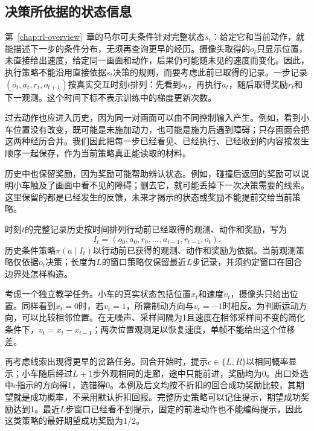 \subsection{决策所依据的状态信息}
\label{sec:rl-information-state-information}

第~\ref{chap:rl-overview}~章的马尔可夫条件针对完整状态$s_t$：给定它和当前动作，就能描述下一步的条件分布，无须再查询更早的经历。摄像头取得的$o_t$只显示位置，未直接给出速度，给定同一画面和动作，后果仍可能随未见的速度而变化。因此，执行策略不能沿用直接依据$s_t$决策的规则，而要考虑此前已取得的记录。一步记录$(o_t,a_t,r_t,o_{t+1})$按真实交互时刻$t$排列：先看到$o_t$，再执行$a_t$，随后取得奖励$r_t$和下一观测。这个时间下标不表示训练中的梯度更新次数。

过去动作也应进入历史，因为同一对画面可以由不同控制输入产生。例如，看到小车位置没有改变，既可能是未施加动力，也可能是施力后遇到障碍；只存画面会把这两种经历合并。我们因此把每一步已经看见、已经执行、已经收到的内容按发生顺序一起保存，作为当前策略真正能读取的材料。

历史中也保留奖励，因为奖励可能帮助辨认状态。例如，碰撞后返回的奖励可以说明小车触及了画面中看不见的障碍；删去它，就可能丢掉下一次决策需要的线索。这里保留的都是已经发生的反馈，未来才揭示的状态或奖励不能提前交给当前策略。

\begin{definition}[决策历史]
  \label{def:rl-information-history}
  时刻$t$的完整记录历史按时间排列行动前已经取得的观测、动作和奖励，写为
  \[
    I_t=(o_0,a_0,r_0,\ldots,a_{t-1},r_{t-1},o_t).
  \]
  历史条件策略$\pi(a\mid I_t)$以行动前已获得的观测、动作和奖励为依据。当前观测策略仅依据$o_t$决策；长度为$L$的窗口策略仅保留最近$L$步记录，并须约定窗口在回合边界处怎样构造。
\end{definition}

\begin{example}[相同位置与不同记忆]
  \label{ex:rl-information-cue}
  考虑一个独立教学任务。小车的真实状态包括位置$x_t$和速度$v_t$，摄像头只给出位置。同样看到$x_t=0$时，若$v_t=1$，所需制动方向与$v_t=-1$时相反。为判断运动方向，可以比较相邻位置。在无噪声、采样间隔为1且速度在相邻采样间不变的简化条件下，$v_t=x_t-x_{t-1}$；两次位置观测足以恢复速度，单帧不能给出这个位移差。

  再考虑线索出现得更早的岔路任务。回合开始时，提示$c\in\{L,R\}$以相同概率显示；小车随后经过$L+1$步外观相同的走廊，途中只能前进，奖励均为0。出口处选中$c$指示的方向得1，选错得0。本例及后文均按不折扣的回合成功奖励比较，其期望就是成功概率，不采用默认折扣回报。完整历史策略可以记住提示，期望成功奖励达到1。最近$L$步窗口已经看不到提示，固定的前进动作也不能编码提示，因此这类策略的最好期望成功奖励为$1/2$。
\end{example}

